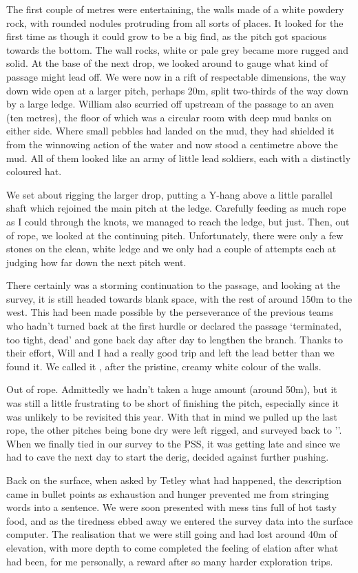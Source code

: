 The first couple of metres were entertaining, the walls made of a white powdery rock, with rounded nodules protruding from all sorts of places. It looked for the first time as though it could grow to be a big find, as the pitch got spacious towards the bottom. The wall rocks, white or pale grey became more rugged and solid. At the base of the next drop, we looked around to gauge what kind of passage might lead off. We were now in a rift of respectable dimensions, the way down wide open at a larger pitch, perhaps 20m, split two-thirds of the way down by a large ledge. William also scurried off upstream of the passage to an aven (ten metres), the floor of which was a circular room with deep mud banks on either side. Where small pebbles had landed on the mud, they had shielded it from the winnowing action of the water and now stood a centimetre above the mud. All of them looked like an army of little lead soldiers, each with a distinctly coloured hat.

We set about rigging the larger drop, putting a Y-hang above a little parallel shaft which rejoined the main pitch at the ledge. Carefully feeding as much rope as I could through the knots, we managed to reach the ledge, but just. Then, out of rope, we looked at the continuing pitch. Unfortunately, there were only a few stones on the clean, white ledge and we only had a couple of attempts each at judging how far down the next pitch went. 

There certainly was a storming continuation to the passage, and looking at the survey, it is still headed towards blank space, with the rest of  around 150m to the west. This had been made possible by the perseverance of the previous teams who hadn’t turned back at the first hurdle or declared the passage ‘terminated, too tight, dead’ and gone back day after day to lengthen the branch.  Thanks to their effort, Will and I had  a really good trip and left the lead better than we found it. We called it , after the pristine, creamy white colour of the walls.

Out of rope. Admittedly we hadn’t taken a huge amount (around 50m), but it was still a little frustrating to be short of finishing the pitch, especially since it was unlikely to be revisited this year.  With that in mind we pulled up the last rope, the other pitches being bone dry were left rigged, and surveyed back to ''. When we  finally tied in our survey to the PSS, it was getting late and since we had to cave the next day to start the derig, decided against further pushing. 

Back on the surface, when asked by Tetley what had happened, the description came in bullet points as exhaustion and hunger prevented me from stringing words into a sentence. We were soon presented with mess tins full of hot tasty food, and as the tiredness ebbed away we entered the survey data into the surface computer. The realisation that we were still going and had lost around 40m of elevation, with more depth to come completed the feeling of elation after what had been, for me personally, a reward after so many harder exploration trips.
